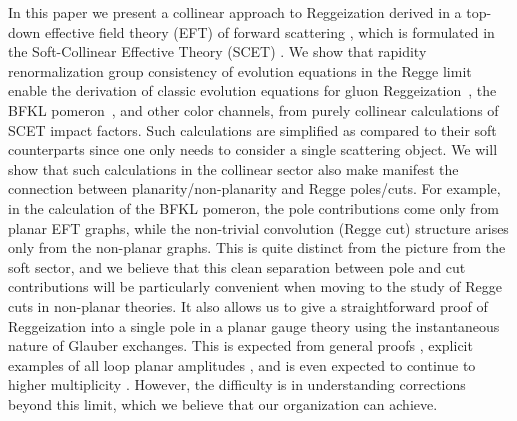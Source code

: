 \documentclass[letterpaper,11pt]{article}
\begin{document}
In this paper we present a collinear approach to Reggeization derived in a top-down effective field theory (EFT) of forward scattering \cite{Rothstein:2016bsq}, which is formulated in the Soft-Collinear Effective Theory (SCET) \cite{Bauer:2000ew, Bauer:2000yr, Bauer:2001ct, Bauer:2001yt}.  We show that rapidity renormalization group \cite{Chiu:2011qc,Chiu:2012ir} consistency of evolution equations in the Regge limit enable the derivation of classic evolution equations for gluon Reggeization~\cite{Fadin:1993wh}, the BFKL pomeron~\cite{Fadin:1993wh}, and other color channels, from purely collinear calculations of SCET impact factors. 
Such calculations are simplified as compared to their soft counterparts since one only needs to consider a single scattering object. We will show that such calculations in the collinear sector also make manifest the connection between planarity/non-planarity and Regge poles/cuts. For example, in the calculation of the BFKL pomeron, the pole contributions come only from planar EFT graphs, while the non-trivial convolution (Regge cut) structure arises only from the non-planar graphs. This is quite distinct from the picture from the soft sector, and we believe that this clean separation between pole and cut contributions will be particularly convenient when moving to the study of Regge cuts in non-planar theories. It also allows us to give a straightforward proof of Reggeization into a single pole in a planar gauge theory using the instantaneous nature of Glauber exchanges. This is expected from general proofs \cite{Mandelstam:1963cw,Caron-Huot:2013fea}, explicit examples of all loop planar amplitudes  \cite{Drummond:2007aua,Korchemsky:2018hnb}, and is even expected to continue to higher multiplicity \cite{DelDuca:2019tur}. However, the difficulty is in understanding corrections beyond this limit, which we believe that our organization can achieve.
\end{document}

